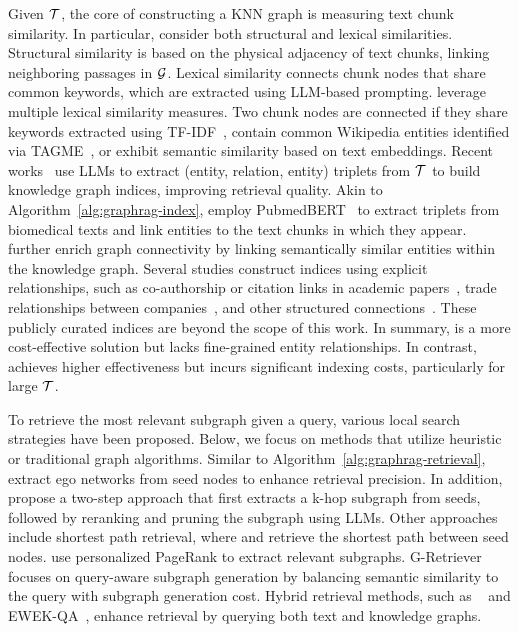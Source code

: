 Given $\mathcal{T}$, the core of constructing a KNN graph is measuring text chunk similarity. In particular, \citet{li2024graph} consider both structural and lexical similarities. Structural similarity is based on the physical adjacency of text chunks, linking neighboring passages in $\mathcal{G}$. Lexical similarity connects chunk nodes that share common keywords, which are extracted using LLM-based prompting.
\citet{wang2024knowledge} leverage multiple lexical similarity measures. Two chunk nodes are connected if they share keywords extracted using TF-IDF~\cite{ramos2003using}, contain common Wikipedia entities identified via TAGME~\cite{min2019knowledge}, or exhibit semantic similarity based on text embeddings.
Recent works~\cite{li2024dalk,delile2024graph,edge2024local,gutierrez2024hipporag} use LLMs to extract (entity, relation, entity) triplets from $\mathcal{T}$ to build knowledge graph indices, improving retrieval quality.
Akin to Algorithm~\ref{alg:graphrag-index}, 
\citet{delile2024graph} employ PubmedBERT~\cite{gu2021domain} to extract triplets from biomedical texts and link entities to the text chunks in which they appear. \citet{gutierrez2024hipporag} further enrich graph connectivity by linking semantically similar entities within the knowledge graph.
Several studies construct \textgraph{} indices using explicit relationships, such as co-authorship or citation links in academic papers~\cite{munikoti2023atlantic}, trade relationships between companies~\cite{cao24companykg}, and other structured connections~\cite{jin2024graph}. These publicly curated indices are beyond the scope of this work.
In summary, \knnrag is a more cost-effective solution but lacks fine-grained entity relationships. In contrast, \kgrag achieves higher effectiveness but incurs significant indexing costs, particularly for large $\mathcal{T}$.

To retrieve the most relevant subgraph given a query, various local search strategies have been proposed. Below, we focus on methods that utilize heuristic or traditional graph algorithms. 
Similar to Algorithm~\ref{alg:graphrag-retrieval}, \citet{jin2024graph} extract ego networks from seed nodes to enhance retrieval precision. In addition, \citet{li2024dalk} propose a two-step approach that first extracts a k-hop subgraph from seeds, followed by reranking and pruning the subgraph using LLMs. Other approaches include shortest path retrieval, where \citet{delile2024graph} and \citet{mavromatis2024gnn} retrieve the shortest path between seed nodes. \citet{gutierrez2024hipporag} use personalized PageRank to extract relevant subgraphs. \textsf{G-Retriever}~\cite{he2024g} focuses on query-aware subgraph generation by balancing semantic similarity to the query with subgraph generation cost. Hybrid retrieval methods, such as \hybridrag~\cite{sarmah2024hybridrag} and \textsf{EWEK-QA}~\cite{dehghan2024ewek}, enhance retrieval by querying both text and knowledge graphs.



